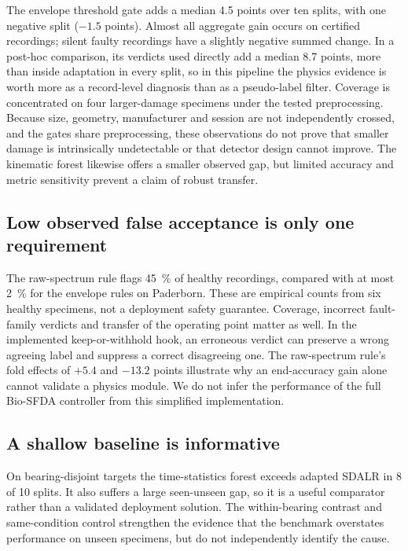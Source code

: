 The envelope threshold gate adds a median 4.5 points over ten splits, with one negative split ($-1.5$ points). Almost all aggregate gain occurs on certified recordings; silent faulty recordings have a slightly negative summed change. In a post-hoc comparison, its verdicts used directly add a median 8.7 points, more than inside adaptation in every split, so in this pipeline the physics evidence is worth more as a record-level diagnosis than as a pseudo-label filter. Coverage is concentrated on four larger-damage specimens under the tested preprocessing. Because size, geometry, manufacturer and session are not independently crossed, and the gates share preprocessing, these observations do not prove that smaller damage is intrinsically undetectable or that detector design cannot improve. The kinematic forest likewise offers a smaller observed gap, but limited accuracy and metric sensitivity prevent a claim of robust transfer.

\subsection{Low observed false acceptance is only one requirement}

The raw-spectrum rule flags \SI{45}{\percent} of healthy recordings, compared with at most \SI{2}{\percent} for the envelope rules on Paderborn. These are empirical counts from six healthy specimens, not a deployment safety guarantee. Coverage, incorrect fault-family verdicts and transfer of the operating point matter as well. In the implemented keep-or-withhold hook, an erroneous verdict can preserve a wrong agreeing label and suppress a correct disagreeing one. The raw-spectrum rule's fold effects of $+5.4$ and $-13.2$ points illustrate why an end-accuracy gain alone cannot validate a physics module. We do not infer the performance of the full Bio-SFDA controller from this simplified implementation.

\subsection{A shallow baseline is informative}

On bearing-disjoint targets the time-statistics forest exceeds adapted SDALR in 8 of 10 splits. It also suffers a large seen-unseen gap, so it is a useful comparator rather than a validated deployment solution. The within-bearing contrast and same-condition control strengthen the evidence that the benchmark overstates performance on unseen specimens, but do not independently identify the cause.

